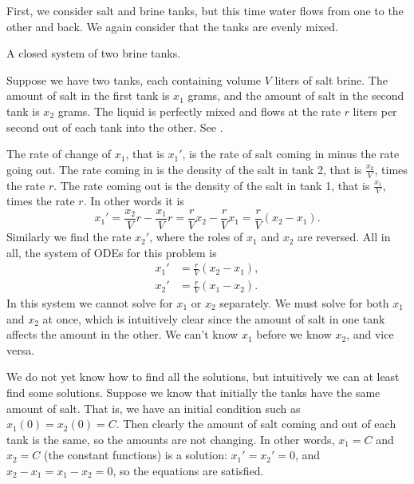 \begin{example} \label{sintro:closedbrine-example}
First, we consider salt and brine tanks, but this time water flows
from one to the other and back.  We again consider that the tanks are
evenly mixed.

\begin{myfig}
\capstart
{}
\caption{A closed system of two brine tanks.\label{sintro:closedbrine}}
\end{myfig}

Suppose we have two tanks, each containing volume $V$ liters of salt brine.
The amount of salt in the first tank is $x_1$ grams, and the amount of salt
in the second tank is $x_2$ grams.  The liquid is perfectly mixed and
flows at the rate $r$ liters per second out of each tank into the other.
See .

The rate of change of $x_1$,
that is $x_1'$, is the
rate of salt coming in minus the rate going out.
The rate coming in is the
density of the salt in tank 2, that is $\frac{x_2}{V}$, times the rate $r$.
The rate coming out is the
density of the salt in tank 1, that is $\frac{x_1}{V}$, times the rate $r$.
In other words it is
\begin{equation*}
x_1' = \frac{x_2}{V} r - \frac{x_1}{V} r =
\frac{r}{V} x_2 - \frac{r}{V} x_1  = \frac{r}{V} (x_2-x_1).
\end{equation*}
Similarly we find the rate $x_2'$, where the roles of $x_1$ and $x_2$
are reversed.  All in all, the system of ODEs for this problem is
\begin{equation*}
\begin{aligned}
x_1' & = \frac{r}{V} (x_2-x_1), \\
x_2' & = \frac{r}{V} (x_1-x_2).
\end{aligned}
\end{equation*}
In this system we cannot solve for $x_1$ or $x_2$ separately.  We must
solve for both $x_1$ and $x_2$ at once, which is intuitively clear since
the amount of salt in one tank affects the amount in the other.
We can't know $x_1$ before we know $x_2$, and vice versa.

We do not yet know how to find all the solutions, but
intuitively we can at least find some solutions.  Suppose we
know that initially the tanks have the same amount of salt.  That is,
we have an initial condition such as $x_1(0)=x_2(0) = C$.  Then clearly the
amount of salt coming and out of each tank is the same, so the amounts are
not changing.  In other words, $x_1 = C$ and $x_2 = C$ (the constant
functions) is a solution:  $x_1' = x_2' = 0$, and
$x_2-x_1 = x_1-x_2 = 0$, so the equations are satisfied.


\end{example}
